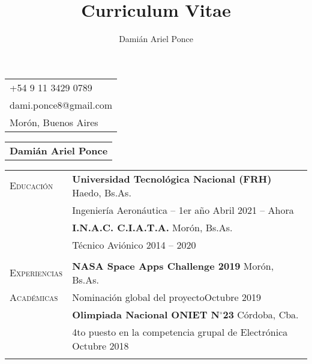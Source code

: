 \documentclass{article}
\title{Curriculum Vitae}
\author{Damián Ariel Ponce}
\begin{document}
   \noindent
   \begin{tabular}[t]{@{}l} 
     +54 9 11 3429 0789\\
   dami.ponce8@gmail.com\\
   Morón, Buenos Aires
   \end{tabular}
   \hfill%
   \begin{tabular}[t]{l@{}} 
      \multirow{3}{*}{\textbf{\huge Damián Ariel Ponce}}
   \end{tabular}
   
   \noindent\hrulefill

   \vspace{0.5\baselineskip}\noindent
   \renewcommand{\arraystretch}{1}%
   \begin{tabular}[t]{@{}p{1.15in} @{}p{5.35in}}
   
   {\scshape Educación}
   &
   \textbf{Universidad Tecnológica Nacional (FRH)}  \hfill Haedo, Bs.As.\vspace{0.015in} \\ &
   Ingeniería Aeronáutica -- 1er año \hfill Abril 2021 -- Ahora\vspace{0.015in}
   \vspace{0.5\baselineskip}
   \\
   & \textbf{I.N.A.C. C.I.A.T.A.}  \hfill Morón, Bs.As.\vspace{0.015in} \\ &
   Técnico Aviónico \hfill 2014 -- 2020\vspace{0.015in}
   \\
   \vspace{0.5\baselineskip}
   \\
      
   {\scshape Experiencias}
   &
   \textbf{NASA Space Apps Challenge 2019}  \hfill Morón, Bs.As.\vspace{0.015in} \\ 
   {\scshape Académicas} %
   & Nominación global del proyecto\hfill Octubre 2019\vspace{0.015in}
   \vspace{0.5\baselineskip}
   \\
   & \textbf{Olimpiada Nacional ONIET N$^{\circ}$23}  \hfill Córdoba, Cba.\vspace{0.015in} \\ &
   4to puesto en la competencia grupal de Electrónica \hfill Octubre 2018\vspace{0.015in}
   \\
   \vspace{0.5\baselineskip}
   \\


\end{tabular}
\end{document}
